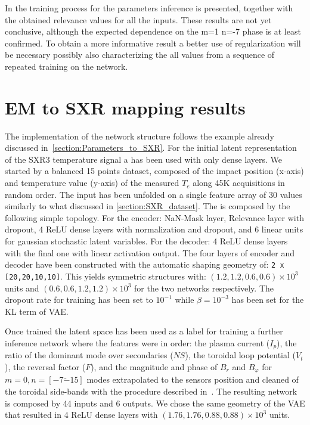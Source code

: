 %
In \Figure{\ref{fig:step_12_7_relevance}} the training process for the parameters inference is presented, together with the obtained relevance values for all the inputs.
These results are not yet conclusive, although the expected dependence on the m=1 n=-7 phase is at least confirmed.
To obtain a more informative result a better use of regularization will be necessary possibly also characterizing the all values from a sequence of repeated training on the network.

\section{EM to SXR mapping results}

The implementation of the network structure follows the example already discussed in~\cref{section:Parameters_to_SXR}.
For the initial latent representation of the SXR3 temperature signal a  has been used with only dense layers. We started by a balanced 15 points dataset, composed of the impact position (x-axis) and temperature value (y-axis) of the measured $T_e$ along 45K acquisitions in random order. The input has been unfolded on a single feature array of 30 values similarly to what discussed in \cref{section:SXR_dataset}. The  is composed by the following simple topology. For the encoder: NaN-Mask layer, Relevance layer with dropout, 4 ReLU dense layers with normalization and dropout, and 6 linear units for gaussian stochastic latent variables. For the decoder: 4 ReLU dense layers with the final one with linear activation output. The four layers of encoder and decoder have been constructed with the automatic shaping geometry of: \texttt{2 x [20,20,10,10]}. This yields symmetric structures with: $(1.2, 1.2, 0.6, 0.6) \times 10^3$ units and $(0.6, 0.6, 1.2, 1.2) \times 10^3$ for the two networks respectively.
The dropout rate for training has been set to $10^{-1}$ while $\beta=10^{-3}$ has been set for the KL term of VAE.

Once trained the  latent space has been used as a label for training a further inference network where the features were in order: the plasma current ($I_p$), the ratio of the dominant mode over secondaries ($NS$), the toroidal loop potential ($V_t$), the reversal factor ($F$), and the magnitude and phase of $B_r$ and $B_\varphi$ for $m=0, n=[-7 \tilde -15]$ modes extrapolated to the sensors position and cleaned of the toroidal side-bands with the procedure described in~\cite{Zanca_2004}.
The resulting network is composed by 44 inputs and 6 outputs. We chose the same geometry of the VAE that resulted in 4 ReLU dense layers with $(1.76, 1.76, 0.88, 0.88) \times 10^3$ units. 

